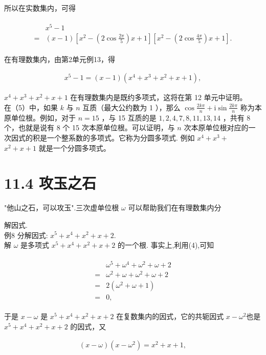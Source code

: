 \documentclass[10pt]{article}
\begin{document}
所以在实数集内，可得

\begin{align*}
\begin{aligned}
& x^{5}-1 \\
= & (x-1)\left[x^{2}-\left(2 \cos \frac{2 \pi}{5}\right) x+1\right]\left[x^{2}-\left(2 \cos \frac{4 \pi}{5}\right) x+1\right] .
\end{aligned}
\end{align*}

在有理数集内，由第2单元例13，得

\begin{align*}
x^{5}-1=(x-1)\left(x^{4}+x^{3}+x^{2}+x+1\right),
\end{align*}

$x^{4}+x^{3}+x^{2}+x+1$ 在有理数集内是既约多项式，这将在第 12 单元中证明。\\
在（5）中，如果 $k$ 与 $n$ 互质（最大公约数为 1 ），那么 $\cos \frac{2 k \pi}{n}+\mathrm{i} \sin \frac{2 k \pi}{n}$ 称为本原单位根。例如，对于 $n=15$ ，与 15 互质的是 $1,2,4,7,8,11,13,14$ ，共有 8 个，也就是说有 8 个 15 次本原单位根。可以证明，与 $n$ 次本原单位根对应的一次因式的积是一个整系数的多项式。它称为分圆多项式. 例如 $x^{4}+x^{3}+$ $x^{2}+x+1$ 就是一个分圆多项式。

\section*{11.4 攻玉之石}
"他山之石，可以攻玉".三次虚单位根 $\omega$ 可以帮助我们在有理数集内分

解因式.\\
例8 分解因式: $x^{5}+x^{4}+x^{2}+x+2$.\\
解 $\omega$ 是多项式 $x^{5}+x^{4}+x^{2}+x+2$ 的一个根. 事实上,利用(4),可知

\begin{align*}
\begin{aligned}
& \omega^{5}+\omega^{4}+\omega^{2}+\omega+2 \\
= & \omega^{2}+\omega+\omega^{2}+\omega+2 \\
= & 2\left(\omega^{2}+\omega+1\right) \\
= & 0,
\end{aligned}
\end{align*}

于是 $x-\omega$ 是 $x^{5}+x^{4}+x^{2}+x+2$ 在复数集内的因式，它的共轭因式 $x-\omega^{2}$也是 $x^{5}+x^{4}+x^{2}+x+2$ 的因式，又

\begin{align*}
(x-\omega)\left(x-\omega^{2}\right)=x^{2}+x+1,
\end{align*}
\end{document}
